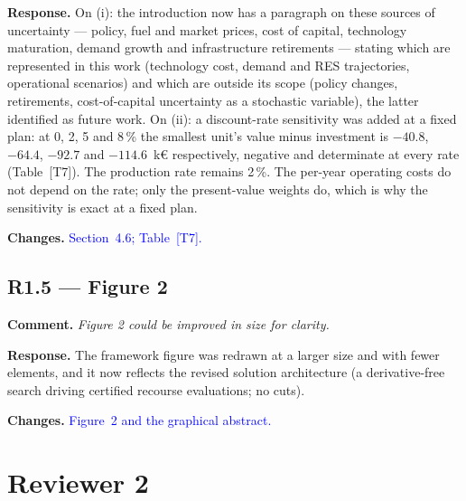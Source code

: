 \documentclass[11pt]{article}
\newcommand{\rcomment}[1]{\par\medskip\noindent\textbf{Comment.} \textit{#1}\par\smallskip}
\newcommand{\rresponse}[1]{\noindent\textbf{Response.} #1\par\smallskip}
\newcommand{\rchanges}[1]{\noindent\textbf{Changes.} \textcolor{blue}{#1}\par\medskip}
\begin{document}
\rresponse{On (i): the introduction now has a paragraph on these sources of uncertainty --- policy, fuel and
market prices, cost of capital, technology maturation, demand growth and infrastructure retirements ---
stating which are represented in this work (technology cost, demand and RES trajectories, operational
scenarios) and which are outside its scope (policy changes, retirements, cost-of-capital uncertainty as a
stochastic variable), the latter identified as future work. On (ii): a discount-rate sensitivity was added
at a fixed plan: at 0, 2, 5 and 8\,\% the smallest unit's
value minus investment is $-40.8$, $-64.4$, $-92.7$ and $-114.6$~k\euro{} respectively, negative and
determinate at every rate (Table~[T7]). The production rate remains 2\,\%. The per-year operating costs do
not depend on the rate; only the present-value weights do, which is why the sensitivity is exact at a
fixed plan.}
\rchanges{Section~4.6; Table~[T7].}

\subsection*{R1.5 --- Figure 2}
\rcomment{Figure 2 could be improved in size for clarity.}
\rresponse{The framework figure was redrawn at a larger size and with fewer elements, and it now reflects
the revised solution architecture (a derivative-free search driving certified recourse evaluations; no
cuts).}
\rchanges{Figure~2 and the graphical abstract.}

\section*{Reviewer 2}
\end{document}
